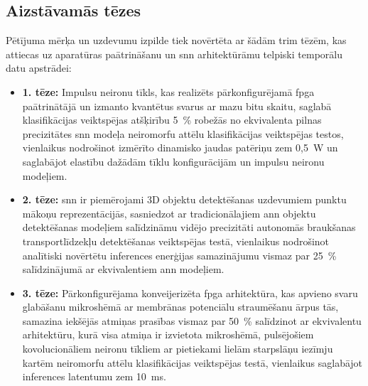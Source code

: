 \subsection{Aizstāvamās tēzes}
Pētījuma mērķa un uzdevumu izpilde tiek novērtēta ar šādām trim tēzēm, kas attiecas uz aparatūras paātrināšanu un \Gls{snn}
arhitektūrāmu telpiski temporālu datu apstrādei:
\begin{itemize}

\item \textbf{1. tēze:} Impulsu neironu tīkls, kas realizēts pārkonfigurējamā \Gls{fpga} paātrinātājā un izmanto kvantētus
  svarus ar mazu bitu skaitu, saglabā klasifikācijas veiktspējas atšķirību 5~\% robežās no ekvivalenta pilnas precizitātes
    \Gls{snn} modeļa neiromorfu attēlu klasifikācijas
    veiktspējas testos, vienlaikus nodrošinot izmērīto dinamisko jaudas
    patēriņu zem 0,5~W un saglabājot elastību dažādām tīklu konfigurācijām un impulsu neironu modeļiem.

\item \textbf{2. tēze:} \Gls{snn} ir piemērojami 3D objektu detektēšanas uzdevumiem punktu mākoņu reprezentācijās, sasniedzot
  ar tradicionālajiem \Gls{ann} objektu detektēšanas modeļiem salīdzināmu vidējo precizitāti autonomās braukšanas
    transportlīdzekļu detektēšanas veiktspējas testā, vienlaikus nodrošinot analītiski novērtētu inferences enerģijas
    samazinājumu vismaz par 25~\% salīdzinājumā ar ekvivalentiem \Gls{ann} modeļiem.

\item \textbf{3. tēze:} Pārkonfigurējama konveijerizēta \Gls{fpga} arhitektūra, kas apvieno svaru glabāšanu mikroshēmā ar
  membrānas potenciālu straumēšanu ārpus tās, samazina iekšējās atmiņas prasības vismaz par 50~\% salīdzinot ar ekvivalentu
    arhitektūru, kurā visa atmiņa ir izvietota mikroshēmā, pulsējošiem kovolucionāliem neironu tīkliem ar pietiekami lielām
    starpslāņu iezīmju kartēm neiromorfu
    attēlu klasifikācijas veiktspējas testā, vienlaikus saglabājot inferences latentumu zem 10~ms.

\end{itemize}

